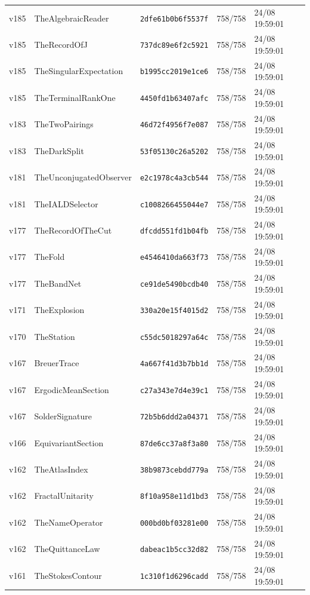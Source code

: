 \documentclass[11pt]{article}
\theoremstyle{definition}\newtheorem{deriv}{Derivação}
\begin{document}
{\begin{longtable}{@{}lllll@{}}
v185 & TheAlgebraicReader & \texttt{2dfe61b0b6f5537f} & 758/758 & 24/08 19:59:01 \\
v185 & TheRecordOfJ & \texttt{737dc89e6f2c5921} & 758/758 & 24/08 19:59:01 \\
v185 & TheSingularExpectation & \texttt{b1995cc2019e1ce6} & 758/758 & 24/08 19:59:01 \\
v185 & TheTerminalRankOne & \texttt{4450fd1b63407afc} & 758/758 & 24/08 19:59:01 \\
v183 & TheTwoPairings & \texttt{46d72f4956f7e087} & 758/758 & 24/08 19:59:01 \\
v183 & TheDarkSplit & \texttt{53f05130c26a5202} & 758/758 & 24/08 19:59:01 \\
v181 & TheUnconjugatedObserver & \texttt{e2c1978c4a3cb544} & 758/758 & 24/08 19:59:01 \\
v181 & TheIALDSelector & \texttt{c1008266455044e7} & 758/758 & 24/08 19:59:01 \\
v177 & TheRecordOfTheCut & \texttt{dfcdd551fd1b04fb} & 758/758 & 24/08 19:59:01 \\
v177 & TheFold & \texttt{e4546410da663f73} & 758/758 & 24/08 19:59:01 \\
v177 & TheBandNet & \texttt{ce91de5490bcdb40} & 758/758 & 24/08 19:59:01 \\
v171 & TheExplosion & \texttt{330a20e15f4015d2} & 758/758 & 24/08 19:59:01 \\
v170 & TheStation & \texttt{c55dc5018297a64c} & 758/758 & 24/08 19:59:01 \\
v167 & BreuerTrace & \texttt{4a667f41d3b7bb1d} & 758/758 & 24/08 19:59:01 \\
v167 & ErgodicMeanSection & \texttt{c27a343e7d4e39c1} & 758/758 & 24/08 19:59:01 \\
v167 & SolderSignature & \texttt{72b5b6ddd2a04371} & 758/758 & 24/08 19:59:01 \\
v166 & EquivariantSection & \texttt{87de6cc37a8f3a80} & 758/758 & 24/08 19:59:01 \\
v162 & TheAtlasIndex & \texttt{38b9873cebdd779a} & 758/758 & 24/08 19:59:01 \\
v162 & FractalUnitarity & \texttt{8f10a958e11d1bd3} & 758/758 & 24/08 19:59:01 \\
v162 & TheNameOperator & \texttt{000bd0bf03281e00} & 758/758 & 24/08 19:59:01 \\
v162 & TheQuittanceLaw & \texttt{dabeac1b5cc32d82} & 758/758 & 24/08 19:59:01 \\
v161 & TheStokesContour & \texttt{1c310f1d6296cadd} & 758/758 & 24/08 19:59:01 \\

\end{longtable}}
\end{document}
